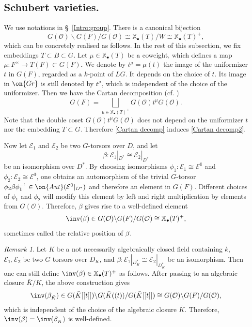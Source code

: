 \documentclass[]{pcmi}
\theoremstyle{plain}
\theoremstyle{remark}
\newtheorem{rmk}[equation]{Remark}
\theoremstyle{definition}
\newcommand{\mE}{{\mathcal E}}
\newcommand{\mO}{{\mathcal O}}
\newcommand{\Aut}{{\on{Aut}}}
\newcommand{\Gr}{{\on{Gr}}}
\def\xcoch{\mathbb{X}_\bullet}
\begin{document}
\subsection{Schubert varieties.}\label{II:Sch var}
We use notations in \S\ \ref{Intro:group}. There is a canonical bijection
\begin{equation}\label{Cartan decomp2}
G(\mO)\backslash G(F)/G(\mO)\cong \xcoch(T)/W\cong \xcoch(T)^+,
\end{equation}
which can be concretely realised as follows. In the rest of this subsection, we fix embeddings $T\subset B\subset G$.
Let $\mu\in\xcoch(T)$ be a coweight, which defines a map $\mu:F^\times\to T(F)\subset G(F)$. We denote by $t^\mu=\mu(t)$ the image of the uniformizer $t$ in $G(F)$, regarded as a $k$-point of $LG$. It depends on the choice of $t$. Its image in $\Gr$ is still denoted by $t^\mu$, which is independent of the choice of the uniformizer. Then we have the Cartan decomposition (cf. \cite[\S\ 3.3.3]{Ti})
\begin{equation}\label{Cartan decomp}
G(F)=\bigsqcup_{\mu\in\xcoch(T)^+} G(\mO)t^\mu G(\mO).
\end{equation}
Note that the double coset $ G(\mO)t^\mu G(\mO)$ does not depend on the uniformizer $t$ nor the embedding $T\subset G$. Therefore \eqref{Cartan decomp} induces \eqref{Cartan decomp2}.


Now let $\mE_1$ and $\mE_2$ be two $G$-torsors over $D$, and let 
\[\beta: \mE_1|_{D^*}\cong \mE_2|_{D^*}\]
be an isomorphism over $D^*$. By choosing isomorphisms $\phi_1:\mE_1\cong \mE^0$ and $\phi_2:\mE_2\cong \mE^0$, one obtains an automorphism of the trivial $G$-torsor $\phi_2\beta\phi_1^{-1}\in \Aut(\mE^0|_{D^*})$ and therefore an element in $G(F)$. Different choices of $\phi_1$ and $\phi_2$ will modify this element by left and right multiplication by elements from $G(\mO)$. Therefore,
$\beta$ gives rise to a well-defined element
\[\inv(\beta)\in G(\mO)\backslash G(F)/G(\mO)\cong \xcoch(T)^+,\]
sometimes called the relative position of $\beta$.
\begin{rmk}\label{non-algebraically closed}
Let $K$ be a not necessarily algebraically closed field containing $k$, $\mE_1, \mE_2$ be two $G$-torsors over $D_K$, and $\beta: \mE_1|_{D^*_K}\cong \mE_2|_{D^*_K}$ be an isomorphism. Then one can still define $\inv(\beta)\in \xcoch(T)^+$ as follows. After passing to an algebraic closure $\bar K/K$, the above construction gives 
$$\inv(\beta_{\bar K})\in G(\bar K[[t]])\backslash G(\bar K((t))/G(\bar K[[t]])\cong G(\mO)\backslash G(F)/G(\mO),$$
which is independent of the choice of the algebraic closure $\bar K$. Therefore, $\inv(\beta)=\inv(\beta_{\bar K})$ is well-defined.
\end{rmk}
\end{document}
